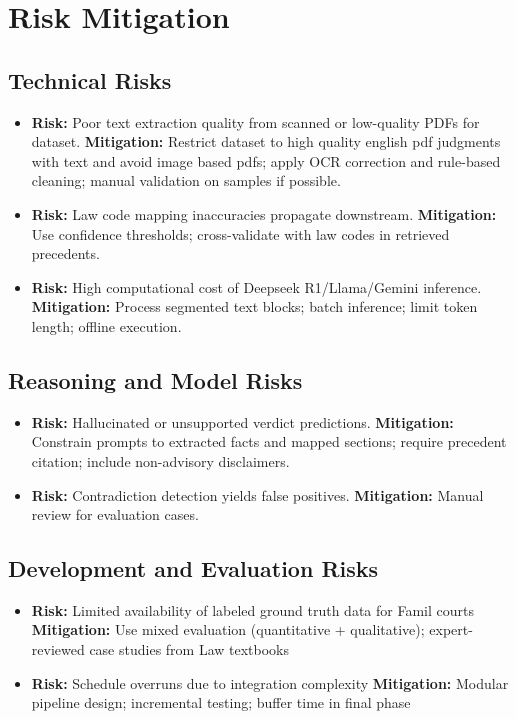 \newpage
\section{Risk Mitigation}

\subsection{Technical Risks}
\begin{itemize}
	\item \textbf{Risk:} Poor text extraction quality from scanned or low-quality PDFs for dataset.
	\textbf{Mitigation:} Restrict dataset to high quality english pdf judgments with text and avoid image based pdfs; apply OCR correction and rule-based cleaning; manual validation on samples if possible.
	\item \textbf{Risk:} Law code mapping inaccuracies propagate downstream.
	\textbf{Mitigation:} Use confidence thresholds; cross-validate with law codes in retrieved precedents.
	\item \textbf{Risk:} High computational cost of Deepseek R1/Llama/Gemini inference.
	\textbf{Mitigation:} Process segmented text blocks; batch inference; limit token length; offline execution.
\end{itemize}

\subsection{Reasoning and Model Risks}
\begin{itemize}
	\item \textbf{Risk:} Hallucinated or unsupported verdict predictions.
	\textbf{Mitigation:} Constrain prompts to extracted facts and mapped sections; require precedent citation; include non-advisory disclaimers.
	\item \textbf{Risk:} Contradiction detection yields false positives.
	\textbf{Mitigation:} Manual review for evaluation cases.
\end{itemize}

\subsection{Development and Evaluation Risks}
\begin{itemize}
	\item \textbf{Risk:} Limited availability of labeled ground truth data for Famil courts
	\textbf{Mitigation:} Use mixed evaluation (quantitative + qualitative); expert-reviewed case studies from Law textbooks
	\item \textbf{Risk:} Schedule overruns due to integration complexity
	\textbf{Mitigation:} Modular pipeline design; incremental testing; buffer time in final phase
\end{itemize}

